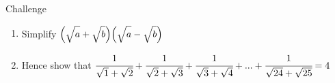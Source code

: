 \documentclass[fleqn]{article}
\begin{document}
\begin{mybox2}[colbacktitle=green]{Challenge}
	\rmfamily
	\begin{enumerate}[label=\textbf{\alph*}]
		\item Simplify $\Big(\sqrt{\strut a}+\sqrt{\strut b}\Big)\Big(\sqrt{\strut a}-\sqrt{\strut b}\Big)$
		\item \vspace{-2mm}Hence show that $\cfrac{1}{\sqrt{1}+\sqrt{2}}+\cfrac{1}{\sqrt{2}+\sqrt{3}}+\cfrac{1}{\sqrt{3}+\sqrt{4}}+...+\cfrac{1}{\sqrt{24}+\sqrt{25}}=4$
	\end{enumerate}

\end{mybox2}
\end{document}

